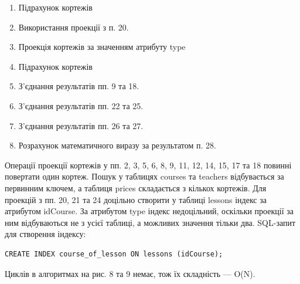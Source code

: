 \begin{enumerate}
\item Підрахунок кортежів
\item Використання проекції з п. 20.
\item Проекція кортежів за значенням атрибуту type
\item Підрахунок кортежів
\item З'єднання результатів пп. 9 та 18.
\item З'єднання результатів пп. 22 та 25.
\item З'єднання результатів пп. 26 та 27.
\item Розрахунок математичного виразу за результатом п. 28.
\end{enumerate}

Операції проекції кортежів у пп. 2, 3, 5, 6, 8, 9, 11, 12, 14, 15, 17 та 18 повинні повертати один кортеж. Пошук у таблицях courses та teachers відбувається за первинним ключем, а таблиця prices складається з кількох кортежів. Для проекцій з пп. 20, 21 та 24 доцільно створити у таблиці lessons індекс за атрибутом idCourse. За атрибутом type індекс недоцільний, оскільки проекції за ним відбуваються не з усієї таблиці, а можливих значення тільки два. SQL-запит для створення індексу:

{ \fontsize{11pt}{12pt} \selectfont
\begin{verbatim}
CREATE INDEX course_of_lesson ON lessons (idCourse);
\end{verbatim}
}

Циклів в алгоритмах на рис. 8 та 9 немає, тож їх складність --- O(N).

